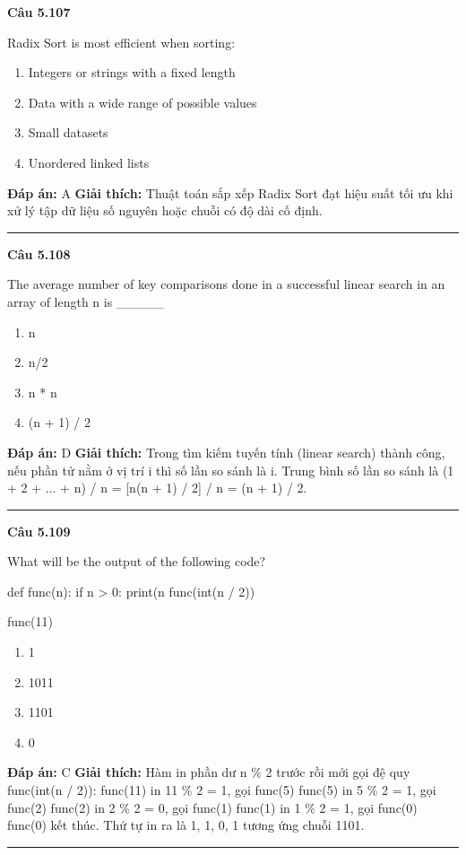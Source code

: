 \documentclass[11pt,a4paper]{article}
\newenvironment{question}[1]{%
  \par\vspace{1em}\noindent\textbf{\large Câu #1}\par\vspace{0.4em}
}{%
  \par\vspace{1em}\hrule\vspace{0.6em}
}
\newenvironment{choices}{%
  \begin{enumerate}[label=\textbf{\Alph*.},leftmargin=2.2em,itemsep=2pt,topsep=3pt]
}{%
  \end{enumerate}
}
\newcommand{\choice}{\item}
\newenvironment{codebox}{%
  \begin{tcolorbox}[colback=gray!8!white,colframe=gray!50!black,arc=1.5mm,boxrule=0.6pt,left=3mm,right=3mm,top=2.5mm,bottom=2.5mm]
  \ttfamily\small
}{%
  \end{tcolorbox}
}
\begin{document}
\begin{question}{5.107}
Radix Sort is most efficient when sorting:
\begin{choices}
\choice Integers or strings with a fixed length
\choice Data with a wide range of possible values
\choice Small datasets
\choice Unordered linked lists
\end{choices}
\textbf{Đáp án:} A
\textbf{Giải thích:} Thuật toán sắp xếp Radix Sort đạt hiệu suất tối ưu khi xử lý tập dữ liệu số nguyên hoặc chuỗi có độ dài cố định.
\end{question}

\begin{question}{5.108}
The average number of key comparisons done in a successful linear search in an array of length n is _____
\begin{choices}
\choice n
\choice n/2
\choice n * n
\choice (n + 1) / 2
\end{choices}
\textbf{Đáp án:} D
\textbf{Giải thích:} Trong tìm kiếm tuyến tính (linear search) thành công, nếu phần tử nằm ở vị trí i thì số lần so sánh là i. Trung bình số lần so sánh là (1 + 2 + ... + n) / n = [n(n + 1) / 2] / n = (n + 1) / 2.
\end{question}

\begin{question}{5.109}
What will be the output of the following code?
\begin{codebox}
def func(n):
    if n > 0:
        print(n %
        func(int(n / 2))

func(11)
\end{codebox}
\begin{choices}
\choice 1
\choice 1011
\choice 1101
\choice 0
\end{choices}
\textbf{Đáp án:} C
\textbf{Giải thích:} Hàm in phần dư n \% 2 trước rồi mới gọi đệ quy func(int(n / 2)):
func(11) in 11 \% 2 = 1, gọi func(5)
func(5) in 5 \% 2 = 1, gọi func(2)
func(2) in 2 \% 2 = 0, gọi func(1)
func(1) in 1 \% 2 = 1, gọi func(0)
func(0) kết thúc.
Thứ tự in ra là 1, 1, 0, 1 tương ứng chuỗi 1101.
\end{question}
\end{document}
